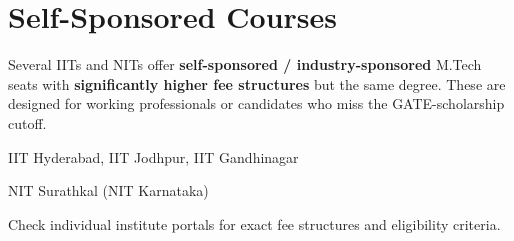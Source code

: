 \section{Self-Sponsored Courses}
\label{sec:self-sponsored}

Several IITs and NITs offer \textbf{self-sponsored / industry-sponsored} M.Tech
seats with \textbf{significantly higher fee structures} but the same degree.
These are designed for working professionals or candidates who miss the
GATE-scholarship cutoff.

\begin{pfActionList}
  \item IIT Hyderabad, IIT Jodhpur, IIT Gandhinagar
  \item NIT Surathkal (NIT Karnataka)
  \item Check individual institute portals for exact fee structures and
        eligibility criteria.
\end{pfActionList}
